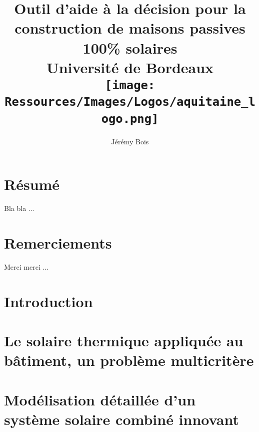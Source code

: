 \documentclass[11pt, oneside, fixOverflow]{JeremyThesis}
\title{
    {Outil d’aide à la décision pour la construction de maisons passives 100\% solaires}\\
    {\large Université de Bordeaux}\\
    {\texttt{[image: Ressources/Images/Logos/aquitaine\_logo.png]}}
}
\author{Jérémy Bois}
\date{}
\begin{document}
\begin{titlepage}
    \maketitle
    \thispagestyle{empty}
\end{titlepage}


\chapter*{Résumé}
Bla bla ...
\chapter*{Remerciements}
Merci merci ...


\tableofcontents
\listoffigures
\listoftables
\listofalgorithms

\printnomenclature[3cm]
\thispagestyle{empty}
\newpage
\listoftodos[Notes]
\newpage


\chapter*{Introduction}
% 

\chapter{Le solaire thermique appliquée au bâtiment, un problème multicritère}
% 

\chapter{Modélisation détaillée d’un système solaire combiné innovant}

\end{document}
